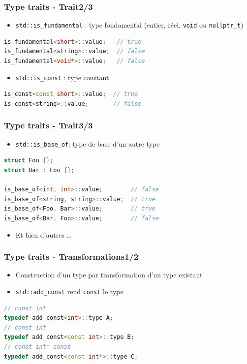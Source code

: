 \documentclass[C++.tex]{subfiles}
\begin{document}
\begin{frame}[fragile]
	\frametitle{Type traits - Trait\titlehfill{}2/3}
	\begin{itemize}
		\item \lstinline|std::is_fundamental| : type fondamental (entier, réel, \lstinline|void| ou \lstinline|nullptr_t|)
	\end{itemize}

	\begin{lstlisting}[language=C++]
is_fundamental<short>::value;   // true
is_fundamental<string>::value;  // false
is_fundamental<void*>::value;   // false\end{lstlisting}

	\begin{itemize}
		\item \lstinline|std::is_const| : type constant
	\end{itemize}

	\begin{lstlisting}[language=C++]
is_const<const short>::value;  // true
is_const<string>::value;       // false\end{lstlisting}
\end{frame}

\begin{frame}[fragile]
	\frametitle{Type traits - Trait\titlehfill{}3/3}
	\begin{itemize}
		\item \lstinline|std::is_base_of|: type de base d'un autre type
	\end{itemize}

	\begin{lstlisting}[language=C++]
struct Foo {};
struct Bar : Foo {};

is_base_of<int, int>::value;        // false
is_base_of<string, string>::value;  // true
is_base_of<Foo, Bar>::value;        // true
is_base_of<Bar, Foo>::value;        // false\end{lstlisting}

	\begin{itemize}
		\item Et bien d'autres \ldots
	\end{itemize}
\end{frame}

\begin{frame}[fragile]
	\frametitle{Type traits - Transformations\titlehfill{}1/2}
	\begin{itemize}
		\item Construction d'un type par transformation d'un type existant
		\item \lstinline|std::add_const| rend \lstinline|const| le type
	\end{itemize}

	\begin{lstlisting}[language=C++]
// const int
typedef add_const<int>::type A;
// const int
typedef add_const<const int>::type B;
// const int* const
typedef add_const<const int*>::type C;\end{lstlisting}
\end{frame}
\end{document}
